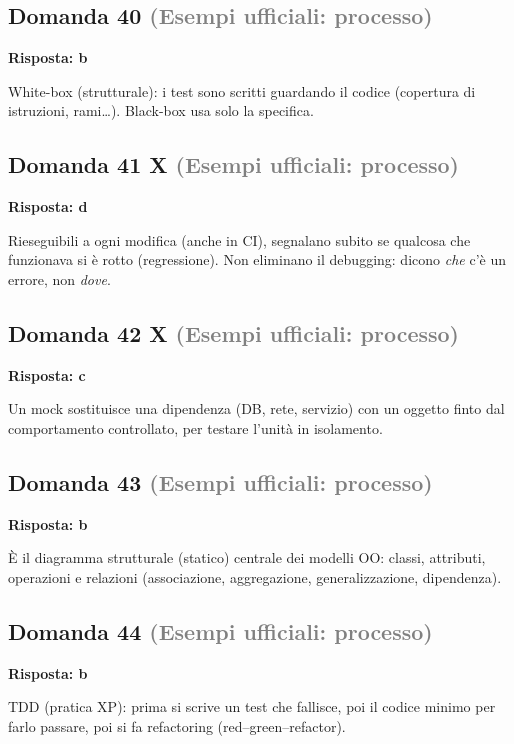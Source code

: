 \documentclass[a4paper,11pt]{article}
\begin{document}
\subsection*{Domanda 40 \hfill {\small \textcolor{gray}{(Esempi ufficiali: processo)}}}
\textbf{Risposta: b}\par
White-box (strutturale): i test sono scritti guardando il codice (copertura di istruzioni, rami…). Black-box usa solo la specifica.



\subsection*{Domanda 41 X \hfill {\small \textcolor{gray}{(Esempi ufficiali: processo)}}}
\textbf{Risposta: d}\par
Rieseguibili a ogni modifica (anche in CI), segnalano subito se qualcosa che funzionava si è rotto (regressione). Non eliminano il debugging: dicono \textit{che} c'è un errore, non \textit{dove}.



\subsection*{Domanda 42 X \hfill {\small \textcolor{gray}{(Esempi ufficiali: processo)}}}
\textbf{Risposta: c}\par
Un mock sostituisce una dipendenza (DB, rete, servizio) con un oggetto finto dal comportamento controllato, per testare l'unità in isolamento.



\subsection*{Domanda 43 \hfill {\small \textcolor{gray}{(Esempi ufficiali: processo)}}}
\textbf{Risposta: b}\par
È il diagramma strutturale (statico) centrale dei modelli OO: classi, attributi, operazioni e relazioni (associazione, aggregazione, generalizzazione, dipendenza).



\subsection*{Domanda 44 \hfill {\small \textcolor{gray}{(Esempi ufficiali: processo)}}}
\textbf{Risposta: b}\par
TDD (pratica XP): prima si scrive un test che fallisce, poi il codice minimo per farlo passare, poi si fa refactoring (red–green–refactor).
\end{document}
